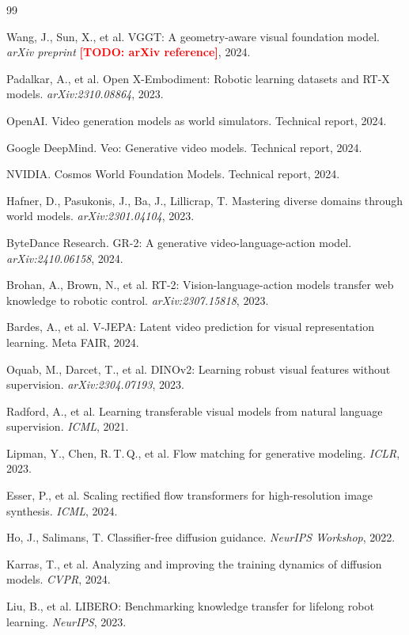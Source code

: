 \documentclass[10pt,letterpaper]{article}
\newcommand{\TODO}[1]{\textcolor{red}{\textbf{[TODO: #1]}}}
\begin{document}
\begin{thebibliography}{99}

Wang, J., Sun, X., et al.
\newblock VGGT: A geometry-aware visual foundation model.
\newblock \emph{arXiv preprint} \TODO{arXiv reference}, 2024.

Padalkar, A., et al.
\newblock Open X-Embodiment: Robotic learning datasets and RT-X models.
\newblock \emph{arXiv:2310.08864}, 2023.

OpenAI.
\newblock Video generation models as world simulators.
\newblock Technical report, 2024.

Google DeepMind.
\newblock Veo: Generative video models.
\newblock Technical report, 2024.

NVIDIA.
\newblock Cosmos World Foundation Models.
\newblock Technical report, 2024.

Hafner, D., Pasukonis, J., Ba, J., Lillicrap, T.
\newblock Mastering diverse domains through world models.
\newblock \emph{arXiv:2301.04104}, 2023.

ByteDance Research.
\newblock GR-2: A generative video-language-action model.
\newblock \emph{arXiv:2410.06158}, 2024.

Brohan, A., Brown, N., et al.
\newblock RT-2: Vision-language-action models transfer web knowledge to robotic control.
\newblock \emph{arXiv:2307.15818}, 2023.

Bardes, A., et al.
\newblock V-JEPA: Latent video prediction for visual representation learning.
\newblock Meta FAIR, 2024.

Oquab, M., Darcet, T., et al.
\newblock DINOv2: Learning robust visual features without supervision.
\newblock \emph{arXiv:2304.07193}, 2023.

Radford, A., et al.
\newblock Learning transferable visual models from natural language supervision.
\newblock \emph{ICML}, 2021.

Lipman, Y., Chen, R.\,T.\,Q., et al.
\newblock Flow matching for generative modeling.
\newblock \emph{ICLR}, 2023.

Esser, P., et al.
\newblock Scaling rectified flow transformers for high-resolution image synthesis.
\newblock \emph{ICML}, 2024.

Ho, J., Salimans, T.
\newblock Classifier-free diffusion guidance.
\newblock \emph{NeurIPS Workshop}, 2022.

Karras, T., et al.
\newblock Analyzing and improving the training dynamics of diffusion models.
\newblock \emph{CVPR}, 2024.

Liu, B., et al.
\newblock LIBERO: Benchmarking knowledge transfer for lifelong robot learning.
\newblock \emph{NeurIPS}, 2023.

\end{thebibliography}
\end{document}
